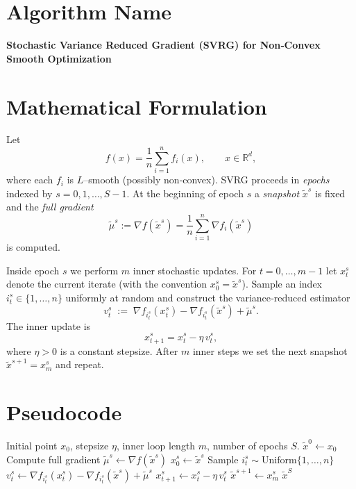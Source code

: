\documentclass{article}
\begin{document}
\section*{Algorithm Name}
\textbf{Stochastic Variance Reduced Gradient (SVRG) for Non‑Convex Smooth Optimization}

\section*{Mathematical Formulation}
Let  
\[
f(x)=\frac{1}{n}\sum_{i=1}^{n}f_i(x),\qquad x\in\mathbb{R}^{d},
\]
where each $f_i$ is $L$–smooth (possibly non‑convex).  
SVRG proceeds in \emph{epochs} indexed by $s=0,1,\dots,S-1$.  
At the beginning of epoch $s$ a \emph{snapshot} $\tilde{x}^{s}$ is fixed and the \emph{full gradient}
\[
\tilde{\mu}^{s}:=\nabla f(\tilde{x}^{s})=\frac{1}{n}\sum_{i=1}^{n}\nabla f_i(\tilde{x}^{s})
\]
is computed.  

Inside epoch $s$ we perform $m$ inner stochastic updates.  
For $t=0,\dots,m-1$ let $x_{t}^{s}$ denote the current iterate (with the convention $x_{0}^{s}=\tilde{x}^{s}$).  
Sample an index $i_t^{s}\in\{1,\dots,n\}$ uniformly at random and construct the variance‑reduced estimator
\[
v_{t}^{s}\;:=\;\nabla f_{i_t^{s}}(x_{t}^{s})-\nabla f_{i_t^{s}}(\tilde{x}^{s})+\tilde{\mu}^{s}.
\]
The inner update is
\[
x_{t+1}^{s}=x_{t}^{s}-\eta\,v_{t}^{s},
\tag{1}
\]
where $\eta>0$ is a constant stepsize.  
After $m$ inner steps we set the next snapshot $\tilde{x}^{s+1}=x_{m}^{s}$ and repeat.

\section*{Pseudocode}
\begin{algorithm}[H]
\caption{SVRG (Non‑Convex Smooth)}\label{alg:svrg}
\begin{algorithmic}[1]
\REQUIRE Initial point $x_{0}$, stepsize $\eta$, inner loop length $m$, number of epochs $S$.
\STATE $\tilde{x}^{0}\gets x_{0}$
    \STATE Compute full gradient $\tilde{\mu}^{s}\gets \nabla f(\tilde{x}^{s})$
    \STATE $x_{0}^{s}\gets \tilde{x}^{s}$
        \STATE Sample $i_t^{s}\sim\text{Uniform}\{1,\dots,n\}$
        \STATE $v_{t}^{s}\gets \nabla f_{i_t^{s}}(x_{t}^{s})-\nabla f_{i_t^{s}}(\tilde{x}^{s})+\tilde{\mu}^{s}$
        \STATE $x_{t+1}^{s}\gets x_{t}^{s}-\eta\,v_{t}^{s}$   
    \ENDFOR
    \STATE $\tilde{x}^{s+1}\gets x_{m}^{s}$
\ENDFOR
\RETURN $\tilde{x}^{S}$
\end{algorithmic}
\end{algorithm}
\end{document}
